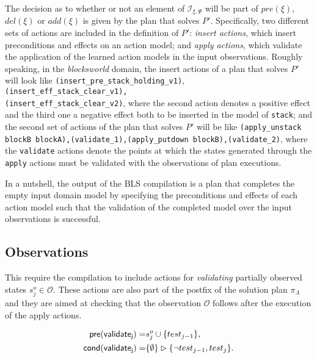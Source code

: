 \documentclass[letterpaper]{article} %
\newcommand{\pre}{\mathsf{pre}}     %
\newcommand{\cond}{\mathsf{cond}}   %
\begin{document}
The decision as to whether or not an element of ${\mathcal I}_{\xi,\Psi}$ will be part of $pre(\xi)$, $del(\xi)$ or $add(\xi)$ is given by the plan that solves $P'$. Specifically, two different sets of actions are included in the definition of $P'$: \emph{insert actions}, which insert preconditions and effects on an action model; and \emph{apply actions}, which validate the application of the learned action models in the input observations. Roughly speaking, in the \emph{blocksworld} domain, the insert actions of a plan that solves $P'$ will look like {\tt{\footnotesize(insert\_pre\_stack\_holding\_v1)}},\\
{\tt{\footnotesize(insert\_eff\_stack\_clear\_v1),\\
(insert\_eff\_stack\_clear\_v2)}}, where the second action denotes a positive effect and the third one a negative effect both to be inserted in the model of {\tt{\small stack}}; and the second set of actions of the plan that solves $P'$ will be like {\tt{\small (apply\_unstack blockB blockA),(validate\_1),(apply\_putdown blockB),(validate\_2)}}, where the {\tt {\small validate}} actions denote the points at which the states generated through the {\tt {\small apply}} actions must be validated with the observations of plan executions.

In a nutshell, the output of the BLS compilation is a plan that completes the empty input domain model by specifying the preconditions and effects of each action model such that the validation of the completed model over the input observations is successful.

\subsection{Observations}
This require the compilation to include actions for {\em validating} partially observed states $s_j^o\in\mathcal{O}$. These actions are also part of the postfix of the solution plan $\pi_\Lambda$ and they are aimed at checking that the observation $\mathcal{O}$ follows after the execution of the apply actions.

\begin{small}
\begin{align*}
\hspace*{7pt}\pre(\mathsf{validate_{j}})=&s_j^o\cup\{test_{j-1}\},\\
\cond(\mathsf{validate_{j}})=&\{\emptyset\}\rhd\{\neg test_{j-1}, test_j\}.
\end{align*}
\end{small}
\end{document}
